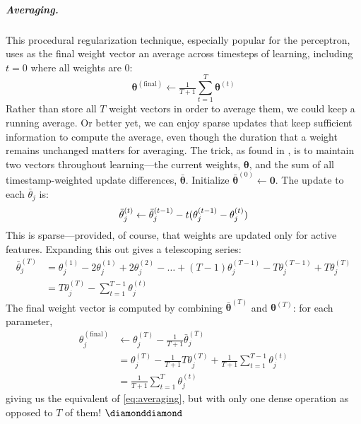 \documentclass[11pt,letterpaper]{article}
\begin{document}
\subparagraph{Averaging.} This procedural regularization technique, especially popular for the perceptron, 
uses as the final weight vector an average across timesteps of learning, including $t=0$ where all weights are 0:
\begin{equation}\label{eq:averaging}
\boldsymbol{\theta}^{(\text{final})} \leftarrow \tfrac{1}{T+1} \sum_{t=1}^{T} \boldsymbol{\theta}^{(t)}
\end{equation} 
Rather than store all $T$ weight vectors in order to average them, we could keep a running average. 
Or better yet, we can enjoy sparse updates that keep sufficient information to compute the average, even though the duration 
that a weight remains unchanged matters for averaging.
The trick, as found in \citep[][p. 19]{daume-06}, is to maintain two vectors throughout learning---the 
current weights, $\boldsymbol{\theta}$, and the sum of all timestamp-weighted update differences, $\bar{\boldsymbol{\theta}}$. 
Initialize $\bar{\boldsymbol{\theta}}^{(0)} \leftarrow \mathbf{0}$. The update to each $\bar{\theta}_j$ is:
\begin{equation}
\bar{\theta}^{(t)}_j \leftarrow \bar{\theta}^{(t-1)}_j - t(\theta^{(t-1)}_j - \theta^{(t)}_j) \\
\end{equation}
This is sparse---provided, of course, that weights are updated only for active features. 
Expanding this out gives a telescoping series:
\begin{align*}
\bar{\theta}^{(T)}_j &= \theta^{(1)}_j - 2\theta^{(1)}_j + 2\theta^{(2)}_j - \ldots + (T-1)\theta^{(T-1)}_j - T\theta^{(T-1)}_j + T\theta^{(T)}_j \\
  &=  T\theta^{(T)}_j - \sum_{t=1}^{T-1} \theta^{(t)}_j
\end{align*}
The final weight vector is computed by combining $\bar{\boldsymbol{\theta}}^{(T)}$ and $\boldsymbol{\theta}^{(T)}$:
for each parameter,
\begin{align}
\theta^{(\text{final})}_j &\leftarrow \theta^{(T)}_j - \tfrac{1}{T+1} \bar{\theta}^{(T)}_j \\
&= \theta^{(T)}_j - \tfrac{1}{T+1} T\theta^{(T)}_j + \tfrac{1}{T+1} \sum_{t=1}^{T-1} \theta^{(t)}_j \nonumber \\
&= \tfrac{1}{T+1} \sum_{t=1}^{T} \theta^{(t)}_j \nonumber 
\end{align}
giving us the equivalent of \cref{eq:averaging}, but with only one dense operation as opposed to $T$ of them! $\diamonddiamond$
\end{document}
